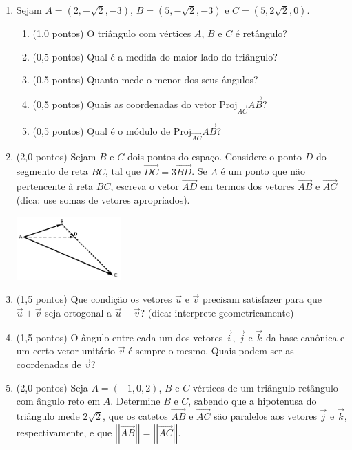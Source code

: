 \documentclass[12pt,a4paper]{article}
\newcommand{\vect}[1]{\overrightarrow{#1}}
\newcommand{\norm}[1]{\left|\left|{#1}\right|\right|}
\begin{document}
\begin{enumerate}
\item Sejam $A = (2, -\sqrt{2}, -3)$, $B=(5, -\sqrt{2}, -3)$ e $C = (5, 2\sqrt{2}, 0)$.
\begin{enumerate}
\item (1,0 pontos) O triângulo com vértices $A$, $B$ e $C$ é retângulo?
\item (0,5 pontos) Qual é a medida do maior lado do triângulo?
\item (0,5 pontos) Quanto mede o menor dos seus ângulos?
\item (0,5 pontos) Quais as coordenadas do vetor $\text{Proj}_{\vect{AC}}\vect{AB}$?
\item (0,5 pontos) Qual é o módulo de $\text{Proj}_{\vect{AC}}\vect{AB}$?
\end{enumerate}

\item (2,0 pontos) Sejam $B$ e $C$ dois pontos do espaço. Considere o ponto $D$ do segmento de reta $BC$, tal que $\vect{DC} = 3 \vect{BD}$. Se $A$ é um ponto que não pertencente à reta $BC$, escreva o vetor $\vect{AD}$ em termos dos vetores $\vect{AB}$ e $\vect{AC}$ (dica: use somas de vetores apropriados).

\includegraphics[width=4.0cm]{img/prova-1-civ-fig1}

\item (1,5 pontos) Que condição os vetores $\vec{u}$ e $\vec{v}$ precisam satisfazer para que $\vec{u} + \vec{v}$ seja ortogonal a $\vec{u} - \vec{v}$? (dica: interprete geometricamente)
\item (1,5 pontos) O ângulo entre cada um dos vetores $\vec{i}$, $\vec{j}$ e $\vec{k}$ da base canônica e um certo vetor unitário $\vec{v}$ é sempre o mesmo. Quais podem ser as coordenadas de $\vec{v}$?
\item (2,0 pontos) Seja $A=(-1,0,2)$, $B$ e $C$ vértices de um triângulo retângulo com ângulo reto em $A$. Determine $B$ e $C$, sabendo que a hipotenusa do triângulo mede $2\sqrt{2}$, que os catetos $\vect{AB}$ e $\vect{AC}$ são paralelos aos vetores $\vec{j}$ e $\vec{k}$, respectivamente, e que $\norm{\vect{AB}} = \norm{\vect{AC}}$.
\end{enumerate}
\end{document}
